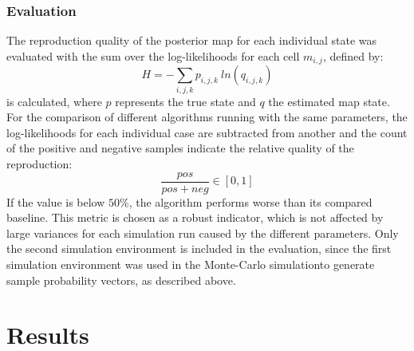 \documentclass[twocolumn,letterpaper]{IEEEAerospaceCLS}  %
\begin{document}
\subsubsection{Evaluation}\label{ssec:MetEval}
The reproduction quality of the posterior map for each individual state was evaluated with the sum over the log-likelihoods for each cell $m_{i,j}$, defined by:
\begin{equation} \label{eq:Entropy}
    H = - \sum_{i,j,k} p_{i,j,k}~ln(q_{i,j,k})
\end{equation}
is calculated, where $p$ represents the true state and $q$ the estimated map state.\\
For the comparison of different algorithms running with the same parameters, the log-likelihoods for each individual case are subtracted from another and the count of the positive and negative samples indicate the relative quality of the reproduction:
\begin{equation} \label{eq:eval}
    \frac{pos}{pos+neg} \in [0, 1]
\end{equation} If the value is below $50$\%, the algorithm performs worse than its compared baseline. This metric is chosen as a robust indicator, which is not affected by large variances for each simulation run caused by the different parameters. 
Only the second simulation environment is included in the evaluation, since the first simulation environment was used in the Monte-Carlo simulationto generate sample probability vectors, as described above.
\section{Results} \label{sec:Res}
\end{document}
